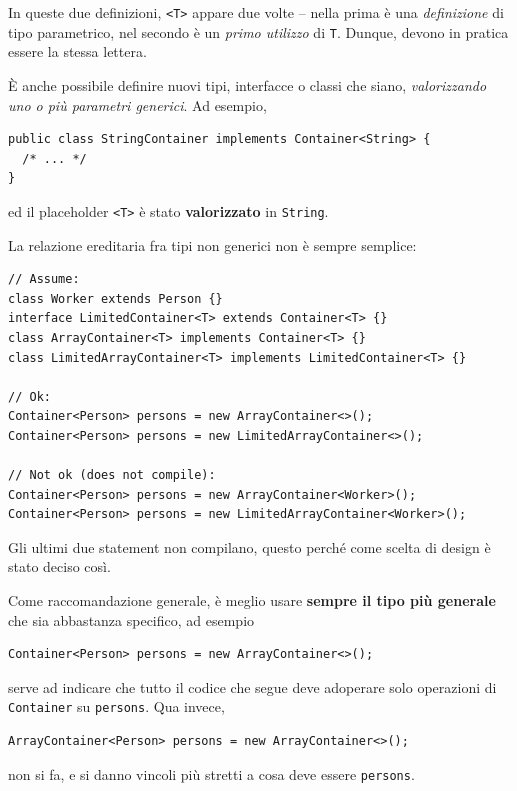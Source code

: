 \documentclass[\fontsizeclass,twocolumn]{\classname}
\theoremstyle{definition}
\theoremstyle{definition}
\begin{document}
In queste due definizioni, \texttt{<T>} appare due volte -- nella prima è una
\emph{definizione} di tipo parametrico, nel secondo è un \emph{primo utilizzo}
di \texttt{T}. Dunque, devono in pratica essere la stessa lettera.

È anche possibile definire nuovi tipi, interfacce o classi che siano, \emph{valorizzando uno o più parametri generici}. Ad esempio,

\begin{lstlisting}
public class StringContainer implements Container<String> {
  /* ... */
}
\end{lstlisting}

ed il placeholder \texttt{<T>} è stato \textbf{valorizzato} in \texttt{String}.

La relazione ereditaria fra tipi non generici non è sempre semplice:

\begin{lstlisting}
// Assume:
class Worker extends Person {}
interface LimitedContainer<T> extends Container<T> {}
class ArrayContainer<T> implements Container<T> {}
class LimitedArrayContainer<T> implements LimitedContainer<T> {}

// Ok:
Container<Person> persons = new ArrayContainer<>();
Container<Person> persons = new LimitedArrayContainer<>();

// Not ok (does not compile):
Container<Person> persons = new ArrayContainer<Worker>();
Container<Person> persons = new LimitedArrayContainer<Worker>();
\end{lstlisting}

Gli ultimi due statement non compilano, questo perché come scelta di design è
stato deciso così.

Come raccomandazione generale, è meglio usare \textbf{sempre il tipo più
generale} che sia abbastanza specifico, ad esempio

\begin{lstlisting}
Container<Person> persons = new ArrayContainer<>();
\end{lstlisting}

serve ad indicare che tutto il codice che segue deve adoperare solo operazioni
di \texttt{Container} su \texttt{persons}. Qua invece, 

\begin{lstlisting}
ArrayContainer<Person> persons = new ArrayContainer<>();
\end{lstlisting}

non si fa, e si danno vincoli più stretti a cosa deve essere \texttt{persons}.
\end{document}
